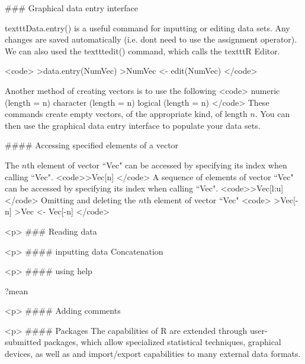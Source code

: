 ### {Graphical data entry interface}

texttt{Data.entry()} is a useful  command for inputting or editing data sets. Any
changes are saved automatically (i.e. dont need to use the assignment
operator). We can also used the texttt{edit()} command, which calls the texttt{R Editor}.

<code>
>data.entry(NumVec)
>NumVec <- edit(NumVec)
</code>

Another method of creating vectors is to use the following
<code>
numeric (length = n)
character (length = n)
logical (length = n)
</code>
These commands create empty vectors, of the appropriate kind, of length $n$. You can then use the graphical data entry interface to populate your data sets.


#### {Accessing specified elements of a vector}

The $n$th element of vector ``Vec" can be accessed by specifying its index when
calling ``Vec".
<code>>Vec[n]
</code>
A sequence of  elements of vector ``Vec" can be accessed by specifying its index
when calling ``Vec".
<code>>Vec[l:u]
</code>
Omitting and deleting the $n$th element of vector ``Vec"
<code>
>Vec[-n]
>Vec <- Vec[-n]
</code>

<p>
### {Reading data}


<p>
#### {inputting data}
 Concatenation

<p>
#### {using help}

?mean

<p>
#### {Adding comments}

<p>
#### {Packages}
The capabilities of R are extended through user-submitted packages, which allow specialized statistical techniques, graphical devices, as well as and
import/export capabilities to many external data formats.
